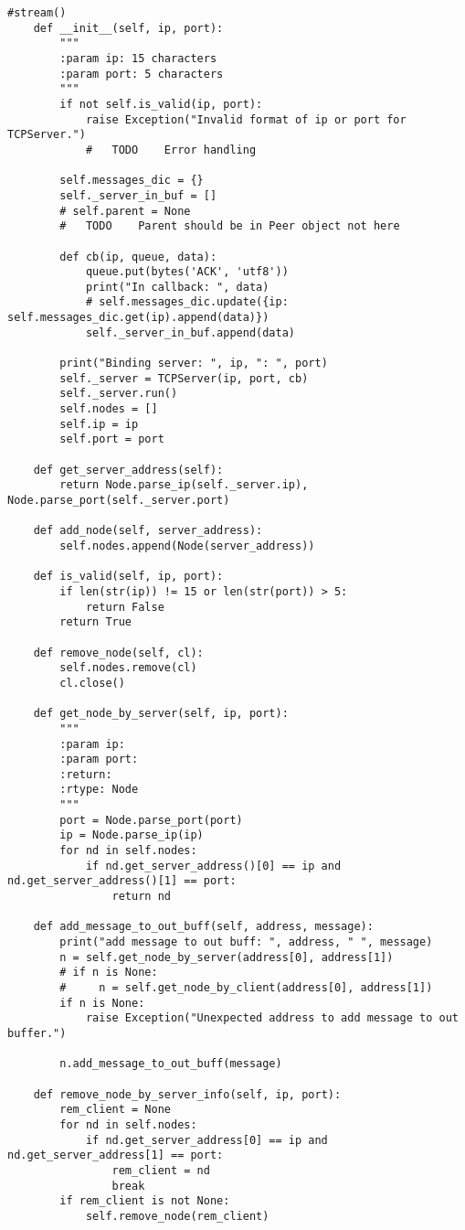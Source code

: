 \documentclass{article}
\begin{document}
\begin{lstlisting}
#stream()
    def __init__(self, ip, port):
        """
        :param ip: 15 characters
        :param port: 5 characters
        """
        if not self.is_valid(ip, port):
            raise Exception("Invalid format of ip or port for TCPServer.")
            #   TODO    Error handling

        self.messages_dic = {}
        self._server_in_buf = []
        # self.parent = None
        #   TODO    Parent should be in Peer object not here

        def cb(ip, queue, data):
            queue.put(bytes('ACK', 'utf8'))
            print("In callback: ", data)
            # self.messages_dic.update({ip: self.messages_dic.get(ip).append(data)})
            self._server_in_buf.append(data)

        print("Binding server: ", ip, ": ", port)
        self._server = TCPServer(ip, port, cb)
        self._server.run()
        self.nodes = []
        self.ip = ip
        self.port = port

    def get_server_address(self):
        return Node.parse_ip(self._server.ip), Node.parse_port(self._server.port)

    def add_node(self, server_address):
        self.nodes.append(Node(server_address))

    def is_valid(self, ip, port):
        if len(str(ip)) != 15 or len(str(port)) > 5:
            return False
        return True

    def remove_node(self, cl):
        self.nodes.remove(cl)
        cl.close()

    def get_node_by_server(self, ip, port):
        """
        :param ip:
        :param port:
        :return:
        :rtype: Node
        """
        port = Node.parse_port(port)
        ip = Node.parse_ip(ip)
        for nd in self.nodes:
            if nd.get_server_address()[0] == ip and nd.get_server_address()[1] == port:
                return nd

    def add_message_to_out_buff(self, address, message):
        print("add message to out buff: ", address, " ", message)
        n = self.get_node_by_server(address[0], address[1])
        # if n is None:
        #     n = self.get_node_by_client(address[0], address[1])
        if n is None:
            raise Exception("Unexpected address to add message to out buffer.")

        n.add_message_to_out_buff(message)

    def remove_node_by_server_info(self, ip, port):
        rem_client = None
        for nd in self.nodes:
            if nd.get_server_address[0] == ip and nd.get_server_address[1] == port:
                rem_client = nd
                break
        if rem_client is not None:
            self.remove_node(rem_client)


\end{lstlisting}
\end{document}
